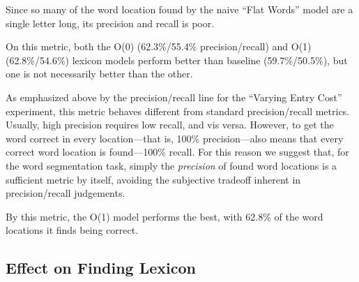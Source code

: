 \documentclass[11pt, oneside, fleqn]{article}
\begin{document}
	Since so many of the word location found by the naive ``Flat Words'' model are a single letter long, its precision and recall is poor.

	On this metric, both the O(0) (62.3\%/55.4\% precision/recall) and O(1) (62.8\%/54.6\%) lexicon models perform better than baseline (59.7\%/50.5\%), but one is not necessarily better than the other.

	As emphasized above by the precision/recall line for the ``Varying Entry Cost'' experiment, this metric behaves different from standard precision/recall metrics. Usually, high precision requires low recall, and vis versa. However, to get the word correct in every location---that is, 100\% precision---also means that every correct word location is found---100\% recall. For this reason we suggest that, for the word segmentation task, simply the \textit{precision} of found word locations is a sufficient metric by itself, avoiding the subjective tradeoff inherent in precision/recall judgements.

	By this metric, the O(1) model performs the best, with 62.8\% of the word locations it finds being correct.

  \subsection{Effect on Finding Lexicon}
\end{document}

